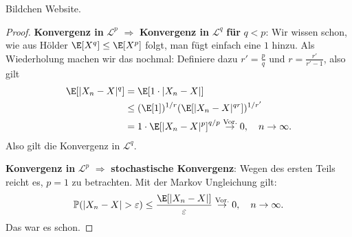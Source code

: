 
\begin{satz}
	Bildchen Website. %
\end{satz}




\begin{proof}
	\textbf{Konvergenz in } $\mathcal L^p$ $\Rightarrow$ \textbf{ Konvergenz in } $\mathcal L^q$ \textbf{ f\"ur } $q<p$:  Wir wissen schon, wie aus H\"older $\E[X^q]\leq \E[X^p]$ folgt, man f\"ugt einfach eine $1$ hinzu. Als Wiederholung machen wir das nochmal: Definiere dazu $r' = \frac{p}{q}$ und $r=\frac{r'}{r'-1}$, also gilt
	\begin{align*}
		\E[|X_n - X|^q]& = \E[1 \cdot |X_n - X|]\\
		& \leq (\E[1])^{1/r}(\E[|X_n - X|^{qr}])^{1/{r'}}\\
		& = 1 \cdot \E[|X_n - X|^p]^{q/p} \overset{\text{Vor.}}{\to} 0, \quad n\to\infty.
	\end{align*}
	Also gilt die Konvergenz in $\mathcal L^q$.\smallskip
	
\textbf{Konvergenz in } $\mathcal L^p$  $\Rightarrow$ \textbf{ stochastische Konvergenz}: Wegen des ersten Teils reicht es, $p=1$ zu betrachten. Mit der Markov Ungleichung gilt:
\begin{align*}
	\mathbb{P}(|X_n - X| > \varepsilon) \leq \frac{\E[|X_n - X|]}{\varepsilon} \overset{\text{Vor.}}{\rightarrow }0,\quad n \to \infty.
\end{align*}
Das war es schon.\smallskip


\end{proof}
